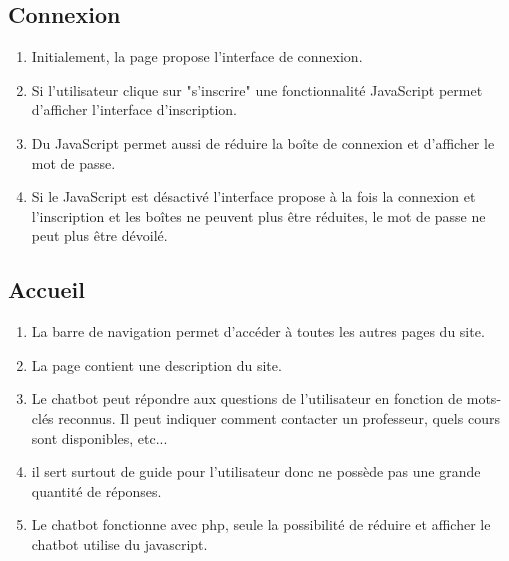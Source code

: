 \documentclass[12pt,a4paper]{article}
\begin{document}
\subsection{Connexion}
\begin{enumerate}
    \item Initialement, la page propose l'interface de connexion.
    \item Si l'utilisateur clique sur "s'inscrire" une fonctionnalité JavaScript permet d'afficher l'interface d'inscription.
    \item Du JavaScript permet aussi de réduire la boîte de connexion et d'afficher le mot de passe.
    \item Si le JavaScript est désactivé l'interface propose à la fois la connexion et l'inscription et les boîtes ne peuvent plus être réduites, le mot de passe ne peut plus être dévoilé.
\end{enumerate}

\subsection{Accueil}
\begin{enumerate}
    \item La barre de navigation permet d'accéder à toutes les autres pages du site.
    \item La page contient une description du site.
    \item Le chatbot peut répondre aux questions de l'utilisateur en fonction de mots-clés reconnus. Il peut indiquer comment contacter un professeur, quels cours sont disponibles, etc...
    \item il sert surtout de guide pour l'utilisateur donc ne possède pas une grande quantité de réponses.
    \item Le chatbot fonctionne avec php, seule la possibilité de réduire et afficher le chatbot utilise du javascript.
\end{enumerate}
\end{document}
